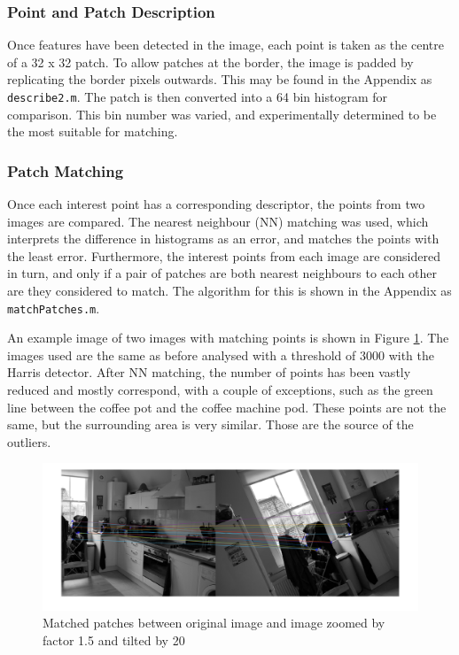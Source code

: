 \documentclass[a4paper, 10pt, conference]{ieeeconf}
\begin{document}
\subsubsection{Point and Patch Description}
Once features have been detected in the image, each point is taken as the centre of a 32 x 32 patch. To allow patches at the border, the image is padded by replicating the border pixels outwards. This may be found in the Appendix as \texttt{describe2.m}. The patch is then converted into a 64 bin histogram for comparison. This bin number was varied, and experimentally determined to be the most suitable for matching.

\subsubsection{Patch Matching}
Once each interest point has a corresponding descriptor, the points from two images are compared. The nearest neighbour (NN) matching was used, which interprets the difference in histograms as an error, and matches the points with the least error. Furthermore, the interest points from each image are considered in turn, and only if a pair of patches are both nearest neighbours to each other are they considered to match. The algorithm for this is shown in the Appendix as \texttt{matchPatches.m}.

An example image of two images with matching points is shown in Figure \ref{fig:matched}. The images used are the same as before analysed with a threshold of 3000 with the Harris detector. After NN matching, the number of points has been vastly reduced and mostly correspond, with a couple of exceptions, such as the green line between the coffee pot and the coffee machine pod. These points are not the same, but the surrounding area is very similar. Those are the source of the outliers.

\begin{figure}[!ht]
  \centering
  \includegraphics[width=\linewidth]{pic/matches}
  \caption{Matched patches between original image and image zoomed by factor 1.5 and tilted by 20\degree}
  \vspace{-0.5cm}
  \label{fig:matched}
\end{figure}
\end{document}
